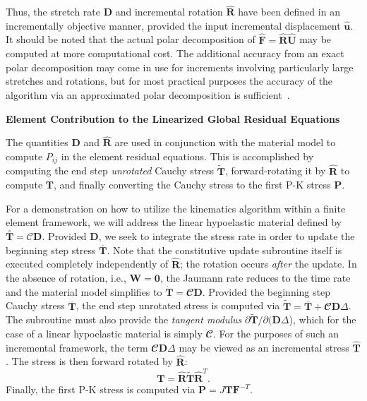 Thus, the stretch rate $\bm{D}$ and incremental rotation $\hat{\bm{R}}$ have been defined in an incrementally objective manner, provided the input incremental displacement $\hat{\bm{u}}$.  It should be noted that the actual polar decomposition of $\hat{\bm{F}} = \hat{\bm{R}}\hat{\bm{U}}$ may be computed at more computational cost. The additional accuracy from an exact polar decomposition may come in use for increments involving particularly large stretches and rotations, but for most practical purposes the accuracy of the algorithm via an approximated polar decomposition is sufficient~\cite{rashid_1993}.

\textbf{Element Contribution to the Linearized Global Residual Equations}

The quantities $\bm{D}$ and $\hat{\bm{R}}$ are used in conjunction with the material model to compute $P_{ij}$ in the element residual equations. This is accomplished by computing the end step \textit{unrotated} Cauchy stress $\tilde{\bm{T}}$, forward-rotating it by $\hat{\bm{R}}$ to compute $\bm{T}$, and finally converting the Cauchy stress to the first P-K stress $\bm{P}$.

For a demonstration on how to utilize the kinematics algorithm within a finite element framework, we will address the linear hypoelastic material defined by $\overset{\circ}{\bm{T}} = \bm{\mathcal{C}}\bm{D}$. Provided $\bm{D}$, we seek to integrate the stress rate in order to update the beginning step stress $\overline{\bm{T}}$. Note that the constitutive update subroutine itself is executed completely independently of $\hat{\bm{R}}$; the rotation occurs \textit{after} the update. In the absence of rotation, i.e., $\bm{W} = \bm{0}$, the Jaumann rate reduces to the time rate and the material model simplifies to $\dot{\bm{T}} = \mathbfcal{C}\bm{D}$. Provided the beginning step Cauchy stress $\overline{\bm{T}}$, the end step unrotated stress is computed via $\tilde{\bm{T}} = \overline{\bm{T}} + \mathbfcal{C}\bm{D}\Delta$. The subroutine must also provide the \textit{tangent modulus} $\partial\tilde{\bm{T}}/\partial({\bm{D}\Delta}$), which for the case of a linear hypoelastic material is simply $\mathbfcal{C}$. For the purposes of such an incremental framework, the term $\mathbfcal{C}\bm{D}\Delta$ may be viewed as an incremental stress $\hat{\bm{T}}$. The stress is then forward rotated by $\hat{\bm{R}}$:
\begin{equation}
\bm{T} = \hat{\bm{R}}\tilde{\bm{T}}\hat{\bm{R}}^T.
\end{equation}
Finally, the first P-K stress is computed via $\bm{P} = J\bm{T}\bm{F}^{-T}$.

